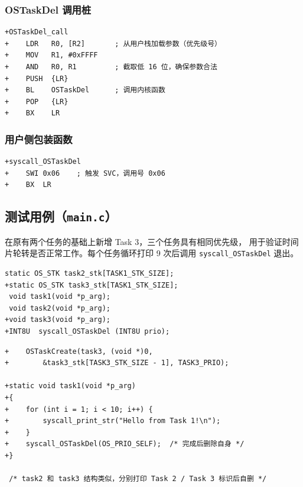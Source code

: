 \documentclass[12pt,a4paper]{article}
\begin{document}
\subsubsection{OSTaskDel 调用桩}

\begin{lstlisting}[style=diffstyle,caption={user\_asm.s — OSTaskDel 调用桩实现}]
+OSTaskDel_call
+    LDR   R0, [R2]       ; 从用户栈加载参数（优先级号）
+    MOV   R1, #0xFFFF
+    AND   R0, R1         ; 截取低 16 位，确保参数合法
+    PUSH  {LR}
+    BL    OSTaskDel      ; 调用内核函数
+    POP   {LR}
+    BX    LR
\end{lstlisting}

\subsubsection{用户侧包装函数}

\begin{lstlisting}[style=diffstyle,caption={user\_asm.s — syscall\_OSTaskDel 用户包装}]
+syscall_OSTaskDel
+    SWI 0x06    ; 触发 SVC，调用号 0x06
+    BX  LR
\end{lstlisting}

\subsection{测试用例（\texttt{main.c}）}

在原有两个任务的基础上新增 Task 3，三个任务具有相同优先级，
用于验证时间片轮转是否正常工作。每个任务循环打印 9 次后调用
\texttt{syscall\_OSTaskDel} 退出。

\begin{lstlisting}[style=diffstyle,caption={main.c — 新增第三个测试任务}]
 static OS_STK task2_stk[TASK1_STK_SIZE];
+static OS_STK task3_stk[TASK1_STK_SIZE];
 void task1(void *p_arg);
 void task2(void *p_arg);
+void task3(void *p_arg);
+INT8U  syscall_OSTaskDel (INT8U prio);
\end{lstlisting}

\begin{lstlisting}[style=diffstyle,caption={main.c — 在 main() 中创建 Task 3 并修改各任务逻辑}]
+    OSTaskCreate(task3, (void *)0,
+        &task3_stk[TASK3_STK_SIZE - 1], TASK3_PRIO);

+static void task1(void *p_arg)
+{
+    for (int i = 1; i < 10; i++) {
+        syscall_print_str("Hello from Task 1!\n");
+    }
+    syscall_OSTaskDel(OS_PRIO_SELF);  /* 完成后删除自身 */
+}

 /* task2 和 task3 结构类似，分别打印 Task 2 / Task 3 标识后自删 */
\end{lstlisting}
\end{document}
